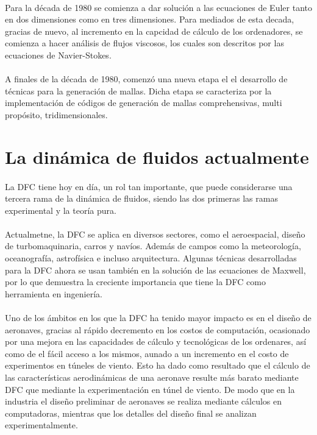 \documentclass[letterpaper, openright, 12pt]{book}
\begin{document}
				\paragraph*{}
					Para la década de 1980 se comienza a dar solución a las ecuaciones de Euler tanto en dos dimensiones como en tres dimensiones. Para mediados de esta decada, gracias de nuevo, al incremento en la capcidad de cálculo de los ordenadores, se comienza a hacer análisis de flujos viscosos, los cuales son descritos por las ecuaciones de Navier-Stokes.\cite{blazek}
				
				\paragraph*{}
					A finales de la década de 1980, comenzó una nueva etapa el el desarrollo de técnicas para la generación de mallas. Dicha etapa se caracteriza por la implementación de códigos de generación de mallas comprehensivas, multi propósito, tridimensionales.\cite{liseikin1999grid}
			
		\section{La dinámica de fluidos actualmente}
				\paragraph*{}
					La DFC tiene hoy en día, un rol tan importante, que puede considerarse una tercera rama de la dinámica de fluidos, siendo las dos primeras las ramas experimental y la teoría pura.\cite{anderson-yotros}
					
				\paragraph*{}
					Actualmetne, la DFC se aplica en diversos sectores, como el aeroespacial, diseño de turbomaquinaria, carros y navíos. Además de campos como la meteorología, oceanografía, astrofísica e incluso arquitectura. Algunas técnicas desarrolladas para la DFC ahora se usan también en la solución de las ecuaciones de Maxwell, por lo que demuestra la creciente importancia que tiene la DFC como herramienta en ingeniería.\cite{blazek}
					
				\paragraph*{}
					Uno de los ámbitos en los que la DFC ha tenido mayor impacto es en el diseño de aeronaves, gracias al rápido decremento en los costos de computación, ocasionado por una mejora en las capacidades de cálculo y tecnológicas de los ordenares, así como de el fácil acceso a los mismos, aunado a un incremento en el costo de experimentos en túneles de viento. Esto ha dado como resultado que el cálculo de las características aerodinámicas de una aeronave resulte más barato mediante DFC que mediante la experimentación en túnel de viento. De modo que en la industria el diseño preliminar de aeronaves se realiza mediante cálculos en computadoras, mientras que los detalles del diseño final se analizan experimentalmente.\cite{anderson-yotros}
					
\end{document}
